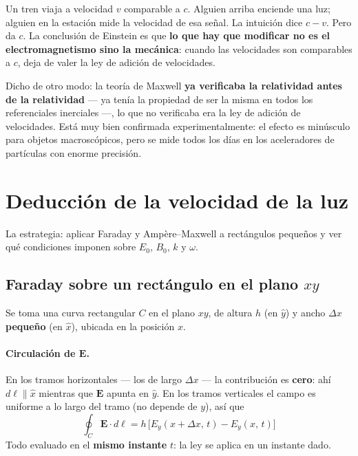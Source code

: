\documentclass[12pt,a4paper]{article}
\begin{document}
\begin{keybox}
Un tren viaja a velocidad $v$ comparable a $c$. Alguien arriba enciende una
luz; alguien en la estación mide la velocidad de esa señal. La intuición dice
$c - v$. Pero da $c$. La conclusión de Einstein es que \textbf{lo que hay que
modificar no es el electromagnetismo sino la mecánica}: cuando las
velocidades son comparables a $c$, deja de valer la ley de adición de
velocidades.
\end{keybox}

Dicho de otro modo: la teoría de Maxwell \textbf{ya verificaba la relatividad
antes de la relatividad} --- ya tenía la propiedad de ser la misma en todos
los referenciales inerciales ---, lo que no verificaba era la ley de adición
de velocidades. Está muy bien confirmada experimentalmente: el efecto es
minúsculo para objetos macroscópicos, pero se mide todos los días en los
aceleradores de partículas con enorme precisión.

\section{Deducción de la velocidad de la luz}

La estrategia: aplicar Faraday y Ampère--Maxwell a rectángulos pequeños y ver
qué condiciones imponen sobre $E_0$, $B_0$, $k$ y $\omega$.



\subsection{Faraday sobre un rectángulo en el plano $xy$}

Se toma una curva rectangular $C$ en el plano $xy$, de altura $h$ (en
$\hat{y}$) y ancho $\Delta x$ \textbf{pequeño} (en $\hat{x}$), ubicada en la
posición $x$.

\paragraph{Circulación de $\mathbf{E}$.}
En los tramos horizontales --- los de largo $\Delta x$ --- la contribución es
\textbf{cero}: ahí $d\boldsymbol{\ell} \parallel \hat{x}$ mientras que
$\mathbf{E}$ apunta en $\hat{y}$. En los tramos verticales el campo es
uniforme a lo largo del tramo (no depende de $y$), así que
\[
\oint_C \mathbf{E}\cdot d\boldsymbol{\ell}
  = h\,\big[E_y(x+\Delta x,\,t) - E_y(x,\,t)\big]
\]
Todo evaluado en el \textbf{mismo instante} $t$: la ley se aplica en un
instante dado.
\end{document}
